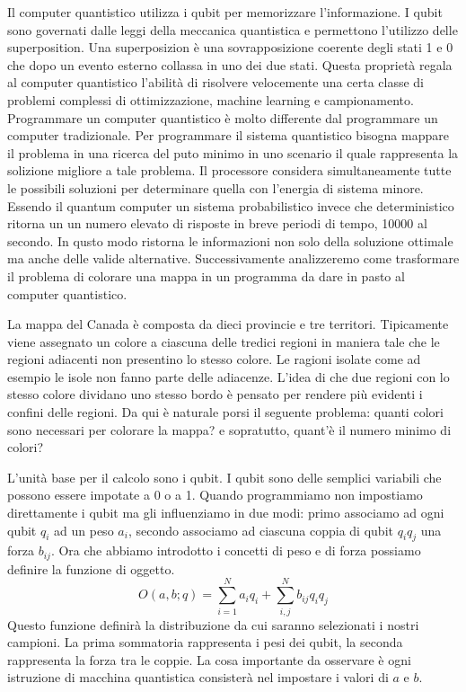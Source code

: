 
Il computer quantistico utilizza i qubit per memorizzare l'informazione. I qubit sono governati dalle leggi della meccanica quantistica e permettono l'utilizzo delle superposition. Una superposizion è una sovrapposizione coerente degli stati 1 e 0 che dopo un evento esterno collassa in uno dei due stati. Questa proprietà regala al computer quantistico l'abilità di risolvere velocemente una certa classe di problemi complessi di ottimizzazione, machine learning e campionamento.
Programmare un computer quantistico è molto differente dal programmare un computer tradizionale. Per programmare il sistema quantistico bisogna mappare il problema in una ricerca del puto minimo in uno scenario il quale rappresenta la solizione migliore a tale problema. Il processore considera simultaneamente tutte le possibili soluzioni per determinare quella con l'energia di sistema minore. Essendo il quantum computer un sistema probabilistico invece che deterministico ritorna un un numero elevato di risposte in breve periodi di tempo, 10000 al secondo. In qusto modo ristorna le informazioni non solo della soluzione ottimale ma anche delle valide alternative. Successivamente analizzeremo come trasformare il problema di colorare una mappa in un programma da dare in pasto al computer quantistico.

La mappa del Canada è composta da dieci provincie e tre territori. Tipicamente viene assegnato un colore a ciascuna delle tredici regioni in maniera tale che le regioni adiacenti non presentino lo stesso colore. Le ragioni isolate come ad esempio le isole non fanno parte delle adiacenze. L'idea di che due regioni con lo stesso colore dividano uno stesso bordo è pensato per rendere più evidenti i confini delle regioni. Da qui è naturale porsi il seguente problema: quanti colori sono necessari per colorare la mappa? e sopratutto, quant'è il numero minimo di colori?

L'unità base per il calcolo sono i qubit. I qubit sono delle semplici variabili che possono essere impotate a 0 o a 1. Quando programmiamo non impostiamo direttamente i qubit ma gli influenziamo in due modi: primo associamo ad ogni qubit $q_i$ ad un peso $a_i$, secondo associamo ad ciascuna coppia di qubit $q_i q_j$ una forza $b_{ij}$. Ora che abbiamo introdotto i concetti di peso e di forza possiamo definire la funzione di oggetto.
$$O(a, b; q) = \sum_{i=1}^N a_i q_i + \sum_{i,j}^N b_{ij} q_i q_j$$
Questo funzione definirà la distribuzione da cui saranno selezionati i nostri campioni. La prima sommatoria rappresenta i pesi dei qubit, la seconda rappresenta la forza tra le coppie. La cosa importante da osservare è ogni istruzione di macchina quantistica consisterà nel impostare i valori di $a$ e $b$.

